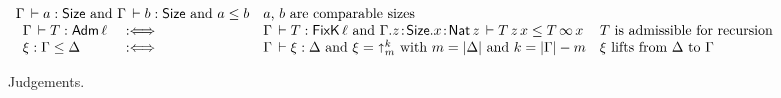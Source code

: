 \begin{figure}[htbp]
\[\begin{array}{l@{\quad}l@{\quad}l@{~}l@{~~}l}
     \multicolumn 2 {@{}l@{\quad}} {\Gamma \der a : \Size \mand \Gamma \der b : \Size \mand a \leq b}
    & \mbox{$a$, $b$ are comparable sizes} \\
  \Gamma \der T : \Adm \ell & \defas &
     \multicolumn 2 {@{}l@{\quad}}
       {\Gamma \der T : \FixK\,\ell \mand \Gamma.z\of\Size.x\of\Nat z \der T\,z\,x \leq T\,\infty\,x}
    & \mbox{%
            $T$ is admissible for recursion} \\
  \xi : \Gamma \leq \Delta & \defas &
     \multicolumn 2 {@{}l@{\quad}}
       {\Gamma \der \xi : \Delta \mand \xi = \slift^k_m
           \mwith m = |\Delta| \mand k = |\Gamma| - m}
    & \mbox{$\xi$ lifts from $\Delta$ to $\Gamma$}
\end{array}
\]
\hrulefill
\vspace{-2ex}
  \caption{Judgements.}
  \label{fig:judge}
\end{figure}

